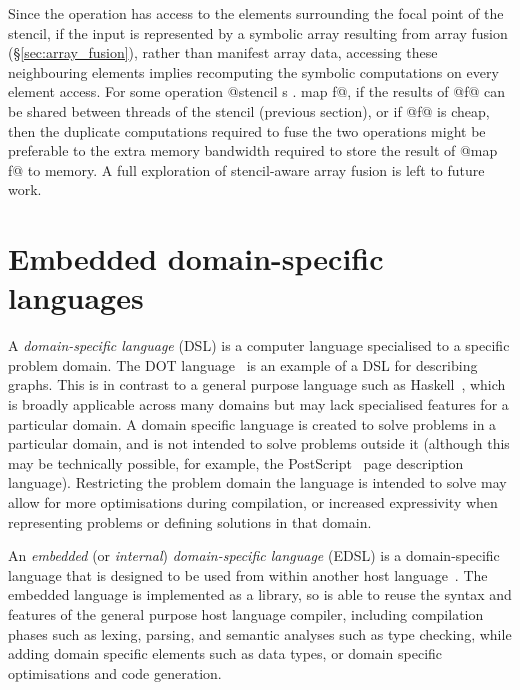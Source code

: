Since the  operation has access to the elements surrounding the
focal point of the stencil, if the input is represented by a symbolic array
resulting from array fusion\fusion{} (\S\ref{sec:array_fusion}), rather than
manifest array data, accessing these neighbouring elements implies recomputing
the symbolic computations on every element access. For some operation
@stencil s . map f@, if the results of @f@ can be shared between threads of the
stencil (previous section), or if @f@ is cheap, then the duplicate computations
required to fuse the two operations might be preferable to the extra memory
bandwidth required to store the result of @map f@ to memory. A full exploration
of stencil-aware array fusion is left to future work.

\cuda[|)]{}
\gpu[|)]{}


\section{Embedded domain-specific languages}
\label{sec:EDSLs}

A \emph{domain-specific language} (DSL) is a computer
language specialised to a specific problem domain. The DOT
language~\cite{Graphviz:1998ui,Ellson:2001wf} is an example of a DSL for
describing graphs. This is in contrast to a general purpose language such as
Haskell~\cite{Haskell:1998}, which is broadly applicable across many domains but
may lack specialised features for a particular domain. A domain specific
language is created to solve problems in a particular domain, and is not
intended to solve problems outside it (although this may be technically
possible, for example, the PostScript~\cite{AdobeSystemsIncorporated:1999ue}
page description language).
Restricting the problem domain the language is intended to solve may allow for
more optimisations during compilation, or increased expressivity when
representing problems or defining solutions in that domain.

An \emph{embedded} (or \emph{internal}) \emph{domain-specific
language}\lang[embedded]{} (EDSL) is a
domain-specific language that is designed to be used
from within another host language~\cite{Hudak:1996}\lang[host]{}. The embedded
language is implemented as a library, so is able to reuse the syntax and
features of the general purpose host language compiler, including compilation
phases such as lexing, parsing, and semantic analyses such as type checking,
while adding domain specific elements such as data types, or domain specific
optimisations and code generation.

